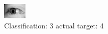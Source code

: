 \begin{figure}[h!]
\begin{center}
\includegraphics[width=0.60\columnwidth]{figures/ID3145_class_3_target_4.png}
\end{center}
\caption{ Classification: 3 actual target: 4}
\label{fig:ID3145_class_3_target_4}
\end{figure}
